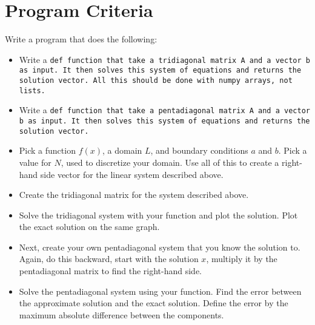 \documentclass{article}
\begin{document}
\section*{Program Criteria}
	Write a program that does the following:
	\begin{itemize}
		\item  Write a \tt{def} function that take a tridiagonal matrix \tt{A} and a vector \tt{b} as input.  It then solves this system of equations and returns the solution vector.  All this should be done with numpy arrays, not lists.
		\item  Write a \tt{def} function that take a pentadiagonal matrix \tt{A} and a vector \tt{b} as input.  It then solves this system of equations and returns the solution vector.
		\item Pick a function $f(x)$, a domain $L$, and boundary conditions $a$ and $b$.  Pick a value for $N$, used to discretize your domain.  Use all of this to create a right-hand side vector for the linear system described above.
		\item Create the tridiagonal matrix for the system described above.
		\item Solve the tridiagonal system with your function and plot the solution.  Plot the exact solution on the same graph.
		\item Next, create your own pentadiagonal system that you know the solution to.  Again, do this backward, start with the solution $x$, multiply it by the pentadiagonal matrix to find the right-hand side. 
		\item Solve the pentadiagonal system using your function.  Find the error between the approximate solution and the exact solution.  Define the error by the maximum absolute difference between the components.
	\end{itemize}







\end{document}
